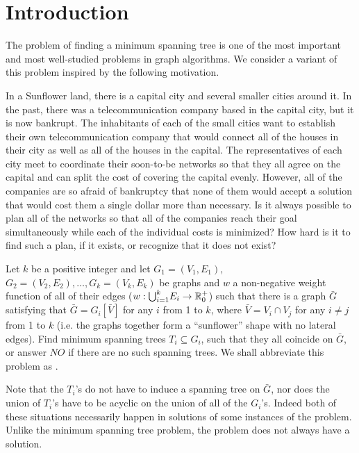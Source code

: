 \section{Introduction} 
The problem of finding a minimum spanning tree is one of the most important and most well-studied problems in graph algorithms. We consider a variant of this problem inspired by the following motivation. 

In a Sunflower land, there is a capital city and several smaller cities around it. In the past, there was a telecommunication company based in the capital city, but it is now bankrupt. The inhabitants of each of the small cities want to establish their own telecommunication company that would connect all of the houses in their city as well as all of the houses in the capital. The representatives of each city meet to coordinate their soon-to-be networks so that they all agree on the capital and can split the cost of covering the capital evenly. However, all of the companies are so afraid of bankruptcy that none of them would accept a solution that would cost them a single dollar more than necessary. Is it always possible to plan all of the networks so that all of the companies reach their goal simultaneously while each of the individual costs is minimized? How hard is it to find such a plan, if it exists, or recognize that it does not exist?

\begin{problem}
Let $k$ be a positive integer and let $G_1=(V_1, E_1),$ $G_2=(V_2, E_2), \ldots, G_k=(V_k, E_k)$ be graphs and $w$ a non-negative weight function of all of their edges ($w:{\bigcup}_{i=1}^{k} E_i \rightarrow \mathbb{R}^{+}_0$) such that there is a graph $\bar{G}$ satisfying that $\bar{G} = G_i[\bar{V}]$ for any $i$ from 1 to $k$, where $\bar{V} = V_i \cap V_j$ for any $i \neq j$ from 1 to $k$ (i.e. the graphs together form a ``sunflower'' shape with no lateral edges). Find minimum spanning trees $T_i\subseteq G_i$, such that they all coincide on $\bar{G}$, or answer $NO$ if there are no such spanning trees. We shall abbreviate this problem as \SMST.
\end{problem}

Note that the $T_i$'s do not have to induce a spanning tree on $\bar{G}$, nor does the union of $T_i$'s have to be acyclic on the union of all of the $G_i$'s. Indeed both of these situations necessarily happen in solutions of some instances of the \SMST problem. Unlike the minimum spanning tree problem, the \SMST problem does not always have a solution.

